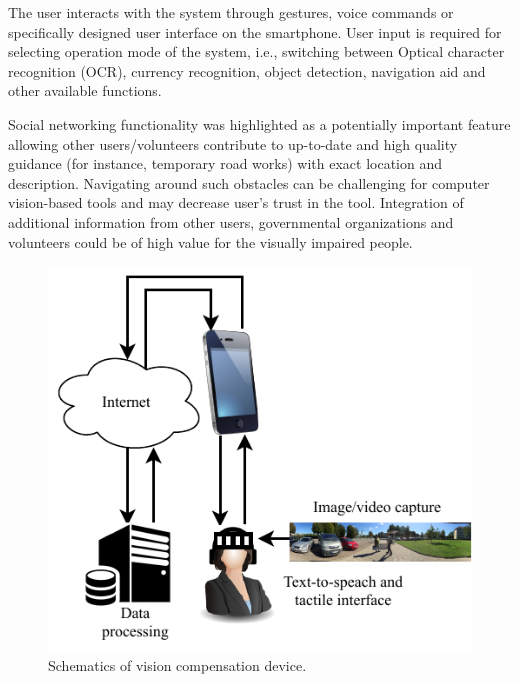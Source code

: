 \documentclass[10pt,conference,compsocconf]{IEEEtran}
\begin{document}
The user interacts with the system through gestures, voice commands or specifically designed user interface on the smartphone. User input is required for selecting operation mode of the system, i.e., switching between Optical character recognition (OCR), currency recognition, object detection, navigation aid and other available functions. 

Social networking functionality was highlighted as a potentially important feature allowing other users/volunteers contribute to up-to-date and high quality guidance (for instance, temporary road works) with exact location and description. Navigating around such obstacles can be challenging for computer vision-based tools and may decrease user's trust in the tool. Integration of additional information from other users, governmental organizations and volunteers could be of high value for the visually impaired people.

\begin{figure}
  \begin{center}
    \includegraphics[scale=1.0]{./img/cropped_diagram.pdf}  
  \end{center}
  \caption{Schematics of vision compensation device.}
  \label{fig:schematics}
\end{figure}
\end{document}
